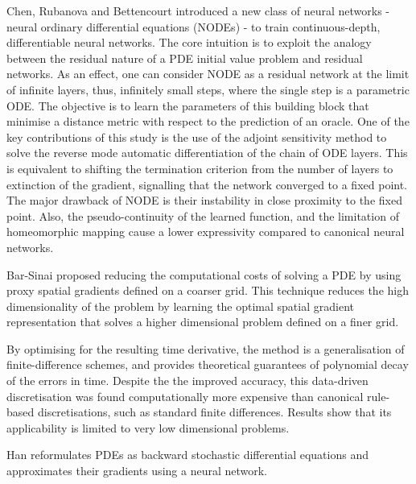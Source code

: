 \documentclass{article}
\begin{document}
            Chen, Rubanova and Bettencourt \cite{Chen2018NeuralEquations} introduced a new class of neural networks - neural ordinary differential equations (NODEs) - to train continuous-depth, differentiable neural networks.
            The core intuition is to exploit the analogy between the residual nature of a PDE initial value problem and residual networks.
            As an effect, one can consider NODE as a residual network at the limit of infinite layers, thus, infinitely small steps, where the single step is a parametric ODE. The objective is to learn the parameters of this building block that minimise a distance metric with respect to the prediction of an oracle. One of the key contributions of this study is the use of the adjoint sensitivity method to solve the reverse mode automatic differentiation of the chain of ODE layers. This is equivalent to shifting the termination criterion from the number of layers to extinction of the gradient, signalling that the network converged to a fixed point. The major drawback of NODE is their instability in close proximity to the fixed point. Also, the pseudo-continuity of the learned function, and the limitation of homeomorphic mapping cause a lower expressivity compared to canonical neural networks.
            
            Bar-Sinai\cite{Bar-Sinai2019LearningEquations} proposed reducing the computational costs of solving a PDE by using proxy spatial gradients defined on a coarser grid.
            This technique reduces the high dimensionality of the problem by learning the optimal spatial gradient representation that solves a higher dimensional problem defined on a finer grid.  
            
            By optimising for the resulting time derivative, the method is a generalisation of finite-difference schemes, and provides theoretical guarantees of polynomial decay of the errors in time. Despite the the improved accuracy, this data-driven discretisation was found computationally more expensive than canonical rule-based discretisations, such as standard finite differences. Results show that its applicability is limited to very low dimensional problems.
            
            Han\cite{Han2018SolvingLearning} reformulates PDEs as backward stochastic differential equations and approximates their gradients using a neural network.

            
\end{document}

